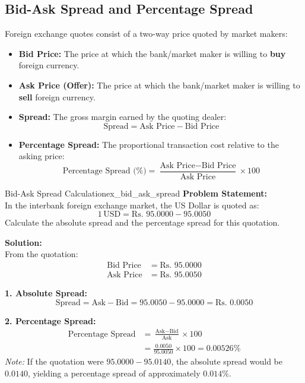 \subsection{Bid-Ask Spread and Percentage Spread}
Foreign exchange quotes consist of a two-way price quoted by market makers:
\begin{itemize}[leftmargin=*]
    \item \textbf{Bid Price:} The price at which the bank/market maker is willing to \textbf{buy} foreign currency.
    \item \textbf{Ask Price (Offer):} The price at which the bank/market maker is willing to \textbf{sell} foreign currency.
    \item \textbf{Spread:} The gross margin earned by the quoting dealer:
    \begin{equation}
        \text{Spread} = \text{Ask Price} - \text{Bid Price}
    \end{equation}
    \item \textbf{Percentage Spread:} The proportional transaction cost relative to the asking price:
    \begin{equation}
        \text{Percentage Spread (\%)} = \frac{\text{Ask Price} - \text{Bid Price}}{\text{Ask Price}} \times 100
    \end{equation}
\end{itemize}

\begin{example}{Bid-Ask Spread Calculation}{ex_bid_ask_spread}
\textbf{Problem Statement:}\\
In the interbank foreign exchange market, the US Dollar is quoted as:
\begin{equation*}
    1\,\text{USD} = \text{Rs. } 95.0000 - 95.0050
\end{equation*}
Calculate the absolute spread and the percentage spread for this quotation.

\tcblower
\textbf{Solution:}\\
From the quotation:
\begin{align*}
    \text{Bid Price} &= \text{Rs. } 95.0000 \\
    \text{Ask Price} &= \text{Rs. } 95.0050
\end{align*}

\noindent\textbf{1. Absolute Spread:}
\begin{equation*}
    \text{Spread} = \text{Ask} - \text{Bid} = 95.0050 - 95.0000 = \text{Rs. } 0.0050
\end{equation*}

\noindent\textbf{2. Percentage Spread:}
\begin{align*}
    \text{Percentage Spread} &= \frac{\text{Ask} - \text{Bid}}{\text{Ask}} \times 100 \\[0.3em]
    &= \frac{0.0050}{95.0050} \times 100 = 0.00526\%
\end{align*}
\textit{Note:} If the quotation were $95.0000 - 95.0140$, the absolute spread would be $0.0140$, yielding a percentage spread of approximately $0.014\%$.
\end{example}

